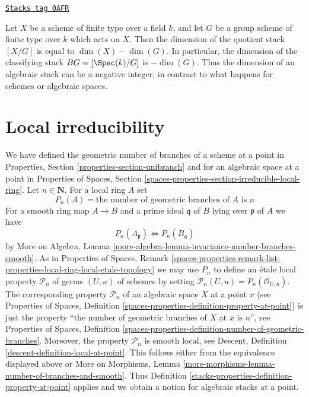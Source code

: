 \begin{example}
\label{stacks-properties-example-dimension-quotient-stack}
\href{https://stacks.math.columbia.edu/tag/0AFR}{\texttt{Stacks tag 0AFR}}

Let $X$ be a scheme of finite type over a field $k$, and let $G$
be a group scheme of finite type over $k$ which acts on $X$.
Then the dimension of the quotient stack $[X/G]$ is equal to
$\dim(X)-\dim(G)$. In particular, the dimension of the classifying
stack $BG=[\Spec(k)/G]$ is $-\dim(G)$. Thus the dimension of an algebraic
stack can be a negative integer, in contrast to what happens for schemes
or algebraic spaces.
\end{example}

\section{Local irreducibility}
\label{stacks-properties-section-irreducible-local-ring}
We have defined the geometric number of branches of a scheme at a point
in Properties, Section \ref{properties-section-unibranch}
and for an algebraic space at a point in Properties of Spaces, Section
\ref{spaces-properties-section-irreducible-local-ring}.
Let $n \in \mathbf{N}$. For a local ring $A$ set
$$
P_n(A) = \text{the number of geometric branches of }A\text{ is }n
$$
For a smooth ring map $A \to B$ and a prime ideal $\mathfrak q$
of $B$ lying over $\mathfrak p$ of $A$ we have
$$
P_n(A_\mathfrak p) \Leftrightarrow P_n(B_\mathfrak q)
$$
by More on Algebra, Lemma
\ref{more-algebra-lemma-invariance-number-branches-smooth}.
As in Properties of Spaces, Remark
\ref{spaces-properties-remark-list-properties-local-ring-local-etale-topology}
we may use $P_n$ to define an \'etale local property $\mathcal{P}_n$
of germs $(U, u)$ of schemes by setting
$\mathcal{P}_n(U, u) = P_n(\mathcal{O}_{U, u})$.
The corresponding property $\mathcal{P}_n$
of an algebraic space $X$ at a point $x$
(see Properties of Spaces, Definition
\ref{spaces-properties-definition-property-at-point})
is just the property
``the number of geometric branches of $X$ at $x$ is $n$'', see
Properties of Spaces, Definition
\ref{spaces-properties-definition-number-of-geometric-branches}.
Moreover, the property $\mathcal{P}_n$ is smooth local, see
Descent, Definition \ref{descent-definition-local-at-point}.
This follows either from the equivalence displayed above
or More on Morphisms, Lemma
\ref{more-morphisms-lemma-number-of-branches-and-smooth}.
Thus Definition \ref{stacks-properties-definition-property-at-point}
applies and we obtain a notion for algebraic stacks at a point.

